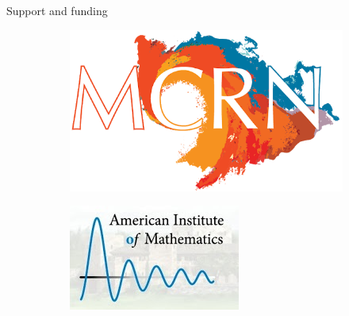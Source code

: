 \documentclass[aspectratio=169]{beamer}
\begin{document}
\begin{frame}{Support and funding}
\begin{figure}
     \centering
     \begin{subfigure}[b]{0.3\textwidth}
         \centering
         \includegraphics[width=\textwidth]{figures/mcrn.png}
     \end{subfigure}
     \hfill
     \begin{subfigure}[b]{0.35\textwidth}
         \centering
         \includegraphics[width=\textwidth]{figures/aim.jpg}
     \end{subfigure}
     \hfill
     \begin{subfigure}[b]{0.3\textwidth}
         \centering

\end{subfigure}
\end{figure}
\end{frame}
\end{document}
